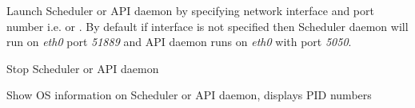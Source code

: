 \documentclass[letterpaper,10pt,english]{sphinxmanual}
\begin{document}

\begin{fulllineitems}
\label{01_how_to_use_it:cmdoption-ccmsh--start}
Launch Scheduler or API daemon by specifying network interface and port number i.e.  or  . By default if interface is not specified then Scheduler daemon will run on \emph{eth0} port \emph{51889} and API daemon runs on \emph{eth0} with port \emph{5050}.

\end{fulllineitems}


\begin{fulllineitems}
\label{01_how_to_use_it:cmdoption-ccmsh--stop}
Stop Scheduler or API daemon

\end{fulllineitems}


\begin{fulllineitems}
\label{01_how_to_use_it:cmdoption-ccmsh--show}
Show OS information on Scheduler or API daemon, displays PID numbers

\end{fulllineitems}
\end{document}
